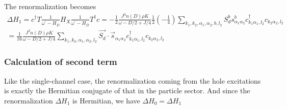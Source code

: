 \documentclass{revtex4-2}
\numberwithin{equation}{section}
\begin{document}
The renormalization becomes
\begin{equation}\begin{aligned}
	\Delta H_1 = c^\dagger T \frac{1}{\omega^\prime - H_D} H_X \frac{1}{\omega^\prime - H_D} T^\dagger c = -\frac{1}{2}\frac{J^3 n(D) \rho K}{\omega - D/2 + J/4}\frac{1}{2}\left( -\frac{1}{4} \right) \sum_{k_1,k_2,\alpha_1,\alpha_2,b,l_2} S_d^b s^b_{\alpha_1 \alpha_2} c^\dagger_{k_1\alpha_1,l_2}c_{k_2 \alpha_2,l_2}\\
=\frac{1}{16}\frac{J^3 n(D) \rho K}{\omega - D/2 + J/4} \sum_{k_1,k_2,\alpha_1,\alpha_2,l_2} \vec{S_d}\cdot\vec{s}_{\alpha_1 \alpha_2} c^\dagger_{k_1\alpha_1,l_2}c_{k_2 \alpha_2,l_2}
\end{aligned}\end{equation}

\subsubsection{Calculation of second term}
Like the single-channel case, the renormalization coming from the hole excitations is exactly the Hermitian conjugate of that in the particle sector. And since the renormalization \(\Delta H_1\) is Hermitian, we have \(\Delta H_0 = \Delta H_1\)
\end{document}
